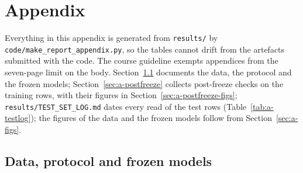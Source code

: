 \section{Appendix}

Everything in this appendix is generated from \texttt{results/} by \texttt{code/make\_report\_appendix.py}, so the tables cannot drift from the artefacts submitted with the code. The course guideline exempts appendices from the seven-page limit on the body. Section~\ref{sec:a-main} documents the data, the protocol and the frozen models; Section~\ref{sec:a-postfreeze} collects post-freeze checks on the training rows, with their figures in Section~\ref{sec:a-postfreeze-figs}; \texttt{results/TEST\_SET\_LOG.md} dates every read of the test rows (Table~\ref{tab:a-testlog}); the figures of the data and the frozen models follow from Section~\ref{sec:a-figs}.

\subsection{Data, protocol and frozen models}\label{sec:a-main}

